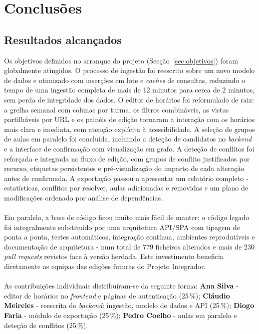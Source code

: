 \documentclass[10pt]{article}
\begin{document}
\section{Conclusões}
	
\subsection{Resultados alcançados}

    Os objetivos definidos no arranque do projeto (Secção~\ref{sec:objetivos}) foram globalmente atingidos.
    O processo de ingestão foi reescrito sobre um novo modelo de dados e otimizado com inserções em lote e \emph{caches} de consultas, reduzindo o tempo de uma ingestão completa de mais de 12 minutos para cerca de 2 minutos, sem perda de integridade dos dados.
    O editor de horários foi reformulado de raiz: a grelha semanal com colunas por turma, os filtros combináveis, as vistas partilháveis por URL e os painéis de edição tornaram a interação com os horários mais clara e imediata, com atenção explícita à acessibilidade.
    A seleção de grupos de aulas em paralelo foi concluída, incluindo a deteção de candidatos no \emph{backend} e a interface de confirmação com visualização em grafo.
    A deteção de conflitos foi reforçada e integrada no fluxo de edição, com grupos de conflito justificados por recurso, etiquetas persistentes e pré-visualização do impacto de cada alteração antes de confirmada.
    A exportação passou a apresentar um relatório completo - estatísticas, conflitos por resolver, aulas adicionadas e removidas e um plano de modificações ordenado por análise de dependências.
    \\\\
    Em paralelo, a base de código ficou muito mais fácil de manter: o código legado foi integralmente substituído por uma arquitetura API/SPA com tipagem de ponta a ponta, testes automáticos, integração contínua, ambientes reprodutíveis e documentação de arquitetura - num total de 779 ficheiros alterados e mais de 230 \emph{pull requests} revistos face à versão herdada. Este investimento beneficia diretamente as equipas das edições futuras do Projeto Integrador.
    \\\\
    As contribuições individuais distribuíram-se da seguinte forma:
    \textbf{Ana Silva} - editor de horários no \emph{frontend} e páginas de autenticação (25\,\%);
    \textbf{Cláudio Meireles} - reescrita do \emph{backend}: ingestão, modelo de dados e API (25\,\%);
    \textbf{Diogo Faria} - módulo de exportação (25\,\%);
    \textbf{Pedro Coelho} - aulas em paralelo e deteção de conflitos (25\,\%).
\end{document}
